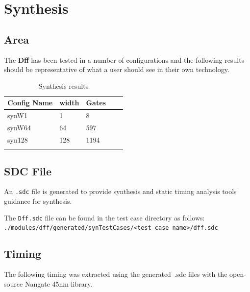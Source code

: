 \section{Synthesis}

\subsection{Area}

The \textbf{Dff} has been tested in a number of configurations and the
following results should be representative of what a user should see in their
own technology.

\renewcommand*{\arraystretch}{1.4}
\begin{longtable}[H]{
    | p{}
    | p{}
    | p{}
    | p{}
    | p{} |
  }
  \hline
  \textbf{Config Name} &
  \textbf{width}       &
  \textbf{Gates}         \\ \hline \hline

  synW1                &
  1                    &
  8                      \\ \hline

  synW64               &
  64                   &
  597                    \\ \hline

  syn128               &
  128                  &
  1194                   \\ \hline

  \caption{Synthesis results}\label{table:area}
\end{longtable}

\subsection{SDC File}
An \texttt{.sdc} file is generated to provide synthesis and static timing
analysis tools guidance for synthesis.

The \texttt{Dff.sdc} file can be found in the test case directory as follows: \\
\texttt{./modules/dff/generated/synTestCases/<test case name>/dff.sdc}

\subsection{Timing}

The following timing was extracted using the generated~.sdc files with the
open-source Nangate 45nm library.


